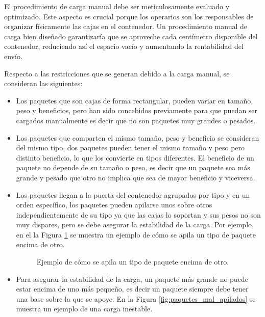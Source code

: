 \documentclass[openany]{article}
\begin{document}
El procedimiento de carga manual debe ser meticulosamente evaluado y optimizado. Este aspecto es crucial porque los operarios son los responsables de organizar físicamente las cajas en el contenedor. Un procedimiento manual de carga bien diseñado garantizaría que se aproveche cada centímetro disponible del contenedor, reduciendo así el espacio vacío y aumentando la rentabilidad del envío.

Respecto a las restricciones que se generan debido a la carga manual, se consideran las siguientes:

\begin{itemize}
    \item Los paquetes que son cajas de forma rectangular, pueden variar en tamaño, peso y beneficios, pero han sido concebidos previamente para que puedan ser cargados manualmente es decir que no son paquetes muy grandes o pesados.
    \item Los paquetes que comparten el mismo tamaño, peso y beneficio se consideran del mismo tipo, dos paquetes pueden tener el mismo tamaño y peso pero distinto beneficio, lo que los convierte en tipos diferentes. El beneficio de un paquete no depende de su tamaño o peso, es decir que un paquete sea más grande y pesado que otro no implica que sea de mayor beneficio y viceversa.
    \item Los paquetes llegan a la puerta del contenedor agrupados por tipo y en un orden específico, los paquetes pueden apilarse unos sobre otros independientemente de su tipo ya que las cajas lo soportan y sus pesos no son muy dispares, pero se debe asegurar la estabilidad de la carga. Por ejemplo, en el la Figura \ref{fig:paquetes_apilados} se muestra un ejemplo de cómo se apila un tipo de paquete encima de otro.
          \begin{figure}[H]
              \centering
              
              \caption{Ejemplo de cómo se apila un tipo de paquete encima de otro.}
              \label{fig:paquetes_apilados}
          \end{figure}
    \item Para asegurar la estabilidad de la carga, un paquete más grande no puede estar encima de uno más pequeño, es decir un paquete siempre debe tener una base sobre la que se apoye. En la Figura \ref{fig:paquetes_mal_apilados} se muestra un ejemplo de una carga inestable.
          \begin{figure}[H]
              \centering
              

\end{figure}
\end{itemize}
\end{document}
